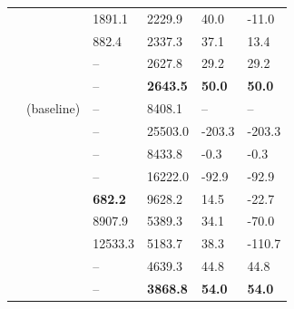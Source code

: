 \begin{table}[t]
\begin{tabularx}{0.99\textwidth}{AA|tatt}
        & \sleb{} & 1891.1 & 2229.9 &  40.0 &  -11.0 \\
        & \shortllama{} & 882.4 & 2337.3 & 37.1 & 13.4 \\
        &  \ourmethodshort{} &  -- &  2627.8 &  29.2 &  29.2 \\
        &  \ourmethodshortconv{} &  -- &  \bfseries 2643.5 &  \bfseries 50.0 & \bfseries {} \bfseries 50.0 \\
        \midrule 
        & \lora{} (baseline) & -- & 8408.1 & -- & --\\
        & \dora{} & -- & 25503.0 & -203.3 & -203.3 \\
        & \pissa{} & -- & 8433.8 & -0.3 & -0.3 \\
        & \adalora{} & -- & 16222.0 & -92.9 & -92.9 \\
        & \uidl{} & \bfseries 682.2 & 9628.2 & 14.5 & -22.7 \\
        & \sleb{} & 8907.9 &  5389.3 & 34.1 & -70.0 \\
        & \shortllama{} & 12533.3 & 5183.7 & 38.3 &-110.7 \\
        &  \ourmethodshort{} &  -- &  4639.3 &  44.8 &  44.8 \\
        &  \ourmethodshortconv{} &  -- &  \bfseries 3868.8 &  \bfseries \bfseries 54.0 &  \bfseries 54.0 \\
        \bottomrule    
    \end{tabularx}
    \label{tab:acceleration_1}
\end{table}